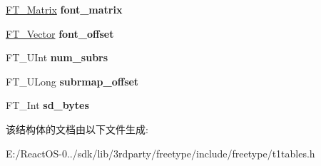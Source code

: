 \begin{DoxyCompactItemize}
\hyperlink{struct_f_t___matrix__}{F\+T\+\_\+\+Matrix} {\bfseries font\+\_\+matrix}
\item 
\mbox{\label{struct_c_i_d___face_dict_rec___aa62daa8d45ed4a817f1207cbd452d61e}} 
\hyperlink{struct_f_t___vector__}{F\+T\+\_\+\+Vector} {\bfseries font\+\_\+offset}
\item 
\mbox{\label{struct_c_i_d___face_dict_rec___a611c406c8d7cd2e37d077070f4bb3ebe}} 
F\+T\+\_\+\+U\+Int {\bfseries num\+\_\+subrs}
\item 
\mbox{\label{struct_c_i_d___face_dict_rec___a45d58111727af70018289e7c5b64ba8c}} 
F\+T\+\_\+\+U\+Long {\bfseries subrmap\+\_\+offset}
\item 
\mbox{\label{struct_c_i_d___face_dict_rec___aecdf98f9671f22c1715ec929b77767ce}} 
F\+T\+\_\+\+Int {\bfseries sd\+\_\+bytes}
\end{DoxyCompactItemize}


该结构体的文档由以下文件生成\+:\begin{DoxyCompactItemize}
\item 
E\+:/\+React\+O\+S-\/0../sdk/lib/3rdparty/freetype/include/freetype/t1tables.\+h\end{DoxyCompactItemize}
